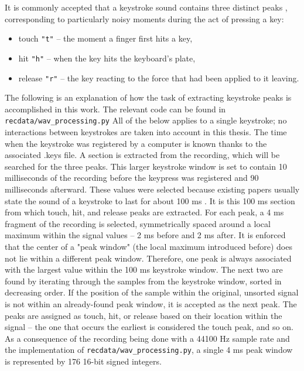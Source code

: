 \documentclass[../main.tex]{subfiles}
\begin{document}
It is commonly accepted that a keystroke sound contains three distinct peaks \cite{og2004, harrison2023practical, revisited2005},
corresponding to particularly noisy moments during the act of pressing a key:
\begin{itemize}
    \item touch \verb|"t"| -- the moment a finger first hits a key,
    \item hit \verb|"h"| -- when the key hits the keyboard's plate,
    \item release \verb|"r"| -- the key reacting to the force that had been applied to it leaving.
\end{itemize}
The following is an explanation of how the task of extracting keystroke peaks is accomplished in this work.
The relevant code can be found in \verb|recdata/wav_processing.py| 
All of the below applies to a single keystroke; no interactions between keystrokes are taken into account in this thesis.
The time when the keystroke was registered by a computer is known thanks to the associated .keys file.
A section is extracted from the recording, which will be searched for the three peaks.
This larger keystroke window is set to contain 10 milliseconds of the recording before the keypress was registered and 90 milliseconds afterward. These values were selected because existing papers usually state the sound of a keystroke
to last for about 100 ms \cite{og2004, dict2006, skype2019, revisited2005}.
It is this 100 ms section from which touch, hit, and release peaks are extracted.
For each peak, a 4 ms fragment of the recording is selected, symmetrically spaced around a local maximum
within the signal values -- 2 ms before and 2 ms after. It is enforced that the center of a "peak window" (the local
maximum introduced before) does not lie within a different peak window. Therefore, one peak is always associated with the 
largest value within the 100 ms keystroke window. The next two are found by iterating through the samples
from the keystroke window, sorted in decreasing order. If the position of the sample within the original,
unsorted signal is not within an already-found peak window, it is accepted as the next peak.
The peaks are assigned as touch, hit, or release based on their location within the signal -- the one that occurs
the earliest is considered the touch peak, and so on.
As a consequence of the recording being done with a 44100 Hz sample rate and the implementation of \verb|recdata/wav_processing.py|, a single 4 ms peak window is represented by 176 16-bit signed integers. 
\end{document}
